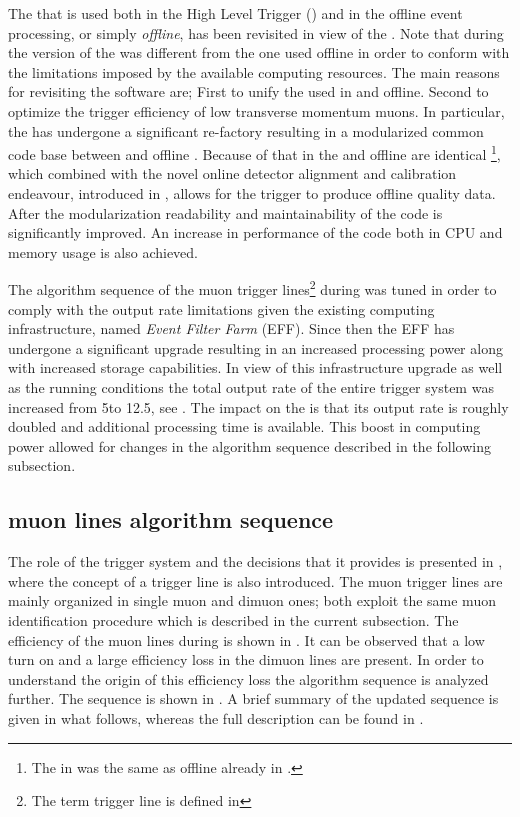 
The \muonID \cite{LHCb-PUB-2009-013,LHCb-PUB-2010-002} that is used both in the High Level Trigger (\hlt) \cite{LHCb-PUB-2011-017}
and in the offline event processing, or simply {\it offline}, has been revisited in view of the \lhc \runtwo.
Note that during \runone the \hlt version of the \muonID was different from the one used offline in order
to conform with the limitations imposed by the available computing resources. The main reasons for revisiting
the software are; First to unify the \muonID used in \hlt and offline.
Second to optimize the trigger efficiency of low transverse momentum muons.
In particular, the \muonID has undergone a significant re-factory resulting in a modularized common code base
between \hlt and offline \cite{kevinThesis}. Because of that \muonID in the \hltone and offline
are identical \footnote{The \muonID in \hlttwo was the same as offline already in \runone.},
which combined with the novel online detector alignment and calibration endeavour, introduced in ,
allows for the trigger to produce offline quality data. After the modularization readability and maintainability
of the code is significantly improved. An increase in performance of the \muonID code both in CPU and memory usage
is also achieved.

The algorithm sequence of the \hltone muon trigger lines\footnote{The term trigger line is defined in }
during \runone was tuned in order to comply with the output rate limitations given the existing computing infrastructure,
named {\it Event Filter Farm} (EFF). Since then the EFF has undergone a significant upgrade resulting in an
increased processing power along with increased storage capabilities. In view of this infrastructure upgrade
as well as the \runtwo \lhc running conditions the total output rate of the entire trigger system was increased
from 5\khz to 12.5\khz, see . The impact on the \hltone is that its output rate is
roughly doubled and additional processing time is available. This boost in computing power allowed for changes
in the \muonID algorithm sequence described in the following subsection.

\subsection{\hltone muon lines algorithm sequence}
\label{hlt1run2}

The role of the trigger system and the decisions that it provides is presented in ,
where the concept of a trigger line is also introduced. The \hltone muon trigger lines are
mainly organized in single muon and dimuon ones; both exploit the same muon identification procedure which
is described in the current subsection. The efficiency of the muon lines during \runone is shown in .
It can be observed that a low \pt turn on and a large efficiency loss in the dimuon lines are present.
In order to understand the origin of this efficiency loss the \hltone algorithm sequence \cite{LHCb-PUB-2011-017}
is analyzed further. The sequence is shown  in . A brief summary of the
updated sequence is given in what follows, whereas the full description can be found in \cite{kevinThesis}.

